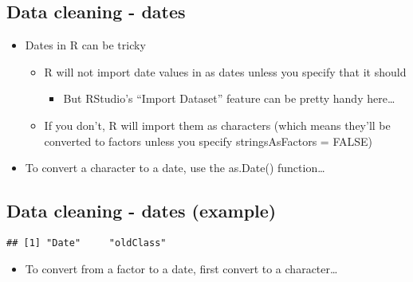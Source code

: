 \documentclass[]{article}
\newenvironment{Shaded}{\begin{snugshade}}{\end{snugshade}}
\newcommand{\KeywordTok}[1]{\textcolor[rgb]{0.13,0.29,0.53}{\textbf{#1}}}
\newcommand{\DataTypeTok}[1]{\textcolor[rgb]{0.13,0.29,0.53}{#1}}
\newcommand{\StringTok}[1]{\textcolor[rgb]{0.31,0.60,0.02}{#1}}
\newcommand{\NormalTok}[1]{#1}
\providecommand{\tightlist}{%
  \setlength{\itemsep}{0pt}\setlength{\parskip}{0pt}}
\begin{document}
\subsection{Data cleaning - dates}\label{data-cleaning---dates}

\begin{itemize}
\tightlist
\item
  Dates in R can be tricky

  \begin{itemize}
  \tightlist
  \item
    R will not import date values in as dates unless you specify that it
    should

    \begin{itemize}
    \tightlist
    \item
      But RStudio's ``Import Dataset'' feature can be pretty handy
      here\ldots{}
    \end{itemize}
  \item
    If you don't, R will import them as characters (which means they'll
    be converted to factors unless you specify stringsAsFactors = FALSE)
  \end{itemize}
\item
  To convert a character to a date, use the as.Date() function\ldots{}
\end{itemize}

\subsection{Data cleaning - dates
(example)}\label{data-cleaning---dates-example}

\begin{Shaded}
\end{Shaded}

\begin{verbatim}
## [1] "Date"     "oldClass"
\end{verbatim}

\begin{itemize}
\tightlist
\item
  To convert from a factor to a date, first convert to a
  character\ldots{}
\end{itemize}
\end{document}
